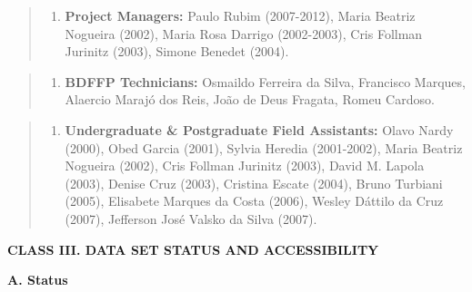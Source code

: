 \documentclass[
  12pt,
  man, donotrepeattitle,floatsintext]{apa6}
\providecommand{\tightlist}{%
  \setlength{\itemsep}{0pt}\setlength{\parskip}{0pt}}
\begin{document}
\begin{quote}
\begin{enumerate}
\def\labelenumi{\alph{enumi}.}
\tightlist
\item
  \textbf{Project Managers:} Paulo Rubim (2007-2012), Maria Beatriz Nogueira (2002), Maria Rosa Darrigo (2002-2003), Cris Follman Jurinitz (2003), Simone Benedet (2004).
\end{enumerate}
\end{quote}

\begin{quote}
\begin{enumerate}
\def\labelenumi{\alph{enumi}.}
\setcounter{enumi}{1}
\tightlist
\item
  \textbf{BDFFP Technicians:} Osmaildo Ferreira da Silva, Francisco Marques, Alaercio Marajó dos Reis, João de Deus Fragata, Romeu Cardoso.
\end{enumerate}
\end{quote}

\begin{quote}
\begin{enumerate}
\def\labelenumi{\alph{enumi}.}
\setcounter{enumi}{2}
\tightlist
\item
  \textbf{Undergraduate \& Postgraduate Field Assistants:} Olavo Nardy (2000), Obed Garcia (2001), Sylvia Heredia (2001-2002), Maria Beatriz Nogueira (2002), Cris Follman Jurinitz (2003), David M. Lapola (2003), Denise Cruz (2003), Cristina Escate (2004), Bruno Turbiani (2005), Elisabete Marques da Costa (2006), Wesley Dáttilo da Cruz (2007), Jefferson José Valsko da Silva (2007).
\end{enumerate}
\end{quote}

\noindent  
\textbf{CLASS III. DATA SET STATUS AND ACCESSIBILITY}

\noindent  
\textbf{A. Status}
\end{document}
